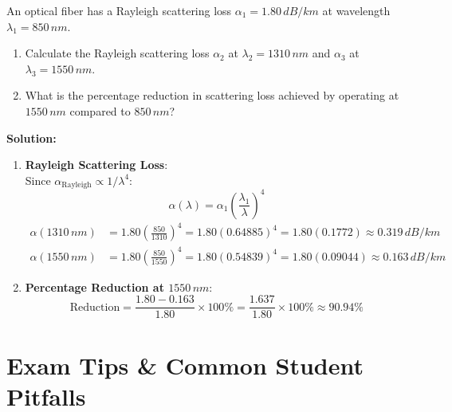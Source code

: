 \begin{example}
An optical fiber has a Rayleigh scattering loss $\alpha_1 = 1.80\,\si{dB/km}$ at wavelength $\lambda_1 = 850\,\si{nm}$.
\begin{enumerate}
    \item Calculate the Rayleigh scattering loss $\alpha_2$ at $\lambda_2 = 1310\,\si{nm}$ and $\alpha_3$ at $\lambda_3 = 1550\,\si{nm}$.
    \item What is the percentage reduction in scattering loss achieved by operating at $1550\,\si{nm}$ compared to $850\,\si{nm}$?
\end{enumerate}

\textbf{Solution:}
\begin{enumerate}
    \item \textbf{Rayleigh Scattering Loss}:\\
    Since $\alpha_{\text{Rayleigh}} \propto 1/\lambda^4$:
    \begin{equation*}
        \alpha(\lambda) = \alpha_1 \left(\frac{\lambda_1}{\lambda}\right)^4
    \end{equation*}
    \begin{align*}
        \alpha(1310\,\si{nm}) &= 1.80 \left( \frac{850}{1310} \right)^4 = 1.80 (0.64885)^4 = 1.80 (0.1772) \approx 0.319\,\si{dB/km} \\
        \alpha(1550\,\si{nm}) &= 1.80 \left( \frac{850}{1550} \right)^4 = 1.80 (0.54839)^4 = 1.80 (0.09044) \approx 0.163\,\si{dB/km}
    \end{align*}
    
    \item \textbf{Percentage Reduction at $1550\,\si{nm}$}:
    \begin{equation*}
        \text{Reduction} = \frac{1.80 - 0.163}{1.80} \times 100\% = \frac{1.637}{1.80} \times 100\% \approx 90.94\%
    \end{equation*}
\end{enumerate}
\end{example}

\section{Exam Tips \& Common Student Pitfalls}

